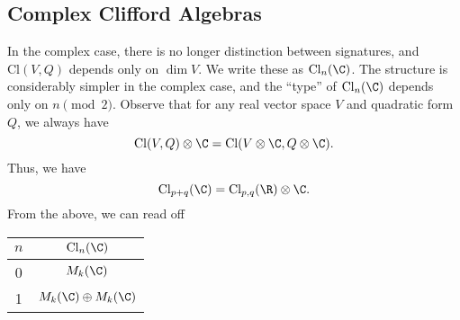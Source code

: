 \documentclass[a4paper]{article}
\newcommand\Cl{\mathrm{Cl}}
\begin{document}
\subsection{Complex Clifford Algebras}
In the complex case, there is no longer distinction between signatures, and $\Cl(V, Q)$ depends only on $\dim V$. We write these as $\Cl_n(\C)$. The structure is considerably simpler in the complex case, and the ``type'' of $\Cl_n(\C)$ depends only on $n \pmod 2$. Observe that for any real vector space $V$ and quadratic form $Q$, we always have
\[
  \Cl(V, Q) \otimes \C = \Cl(V \otimes \C, Q \otimes \C).
\]
Thus, we have
\[
  \Cl_{p + q}(\C) = \Cl_{p, q}(\R) \otimes \C.
\]
From the above, we can read off
\begin{center}
  \begin{tabular}{cc}
    \toprule
    $n$ & $\Cl_{n}(\C)$ \\
    \midrule
    0 & $M_k(\C)$\\
    1 & $M_k(\C) \oplus M_k(\C)$\\
    \bottomrule
  \end{tabular}
\end{center}

\end{document}

